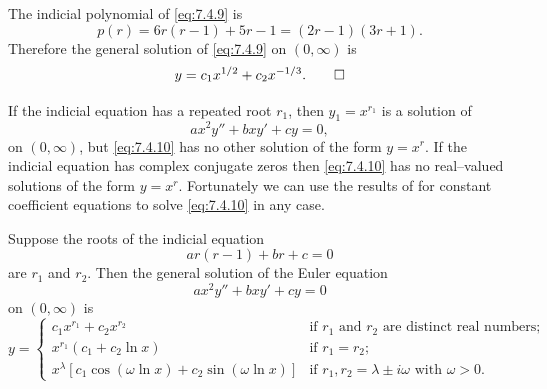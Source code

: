 \begin{solution}
 The indicial polynomial of \eqref{eq:7.4.9} is
\[
p(r)=6r(r-1)+5r-1=(2r-1)(3r+1).
\]
Therefore the general solution of \eqref{eq:7.4.9} on
$(0,\infty)$ is
\[
y=c_1x^{1/2}+c_2x^{-1/3}. \qedhere
\]
\end{solution}

If the indicial equation  has a repeated root $r_1$, then
$y_1=x^{r_1}$ is a solution of
\begin{equation} \label{eq:7.4.10}
ax^2y''+bxy'+cy=0,
\end{equation}
on $(0,\infty)$, but \eqref{eq:7.4.10} has no other solution of the form
$y=x^r$. If the indicial equation has complex conjugate zeros then
\eqref{eq:7.4.10} has no real--valued solutions of the form $y=x^r$.
Fortunately we can use the results of  for
constant coefficient equations to solve \eqref{eq:7.4.10} in any case.

\begin{theorem}\label{thmtype:7.4.3}
Suppose the roots of the indicial equation
\begin{equation}
\label{eq:7.4.11} ar(r-1)+br+c=0
\end{equation}
are $r_1$ and $r_2$. Then the general solution of the Euler equation
\begin{equation} \label{eq:7.4.12}
ax^2y''+bxy'+cy=0
\end{equation}
on $(0,\infty)$ is
\[
y=\begin{cases}
c_1x^{r_1}+c_2x^{r_2}&\text{if $r_1$ and $r_2$ are distinct real numbers;}\\
x^{r_1}(c_1+c_2\ln x)&\text{if $r_1=r_2$;}\\
x^{\lambda}\left[c_1\cos\left(\omega\ln x\right)+
c_2\sin\left(\omega\ln x \right)\right]
&\text{if $r_1,r_2=\lambda\pm i\omega$ with $\omega>0$}.
\end{cases}
\]
\end{theorem}

